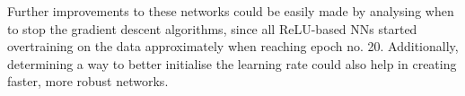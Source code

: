 \documentclass{article}
\begin{document}
Further improvements to these networks could be easily made by analysing when to stop the gradient descent algorithms, since all ReLU-based NNs started overtraining on the data approximately when reaching epoch no. 20. Additionally, determining a way to better initialise the learning rate could also help in creating faster, more robust networks. 


\end{document}
